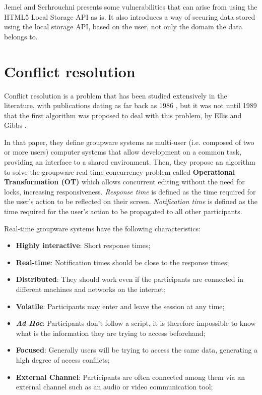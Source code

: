 Jemel and Serhrouchni \cite{Jemel2014} presents some vulnerabilities that can arise from using the HTML5 Local Storage API as is. It also introduces a way of securing data stored using the local storage API, based on the user, not only the domain the data belongs to.


\section{Conflict resolution}\label{sec:conflict-res-sota}

Conflict resolution is a problem that has been studied extensively in the literature, with publications dating as far back as 1986 \cite{Greif1986}, but it was not until 1989 that the first algorithm was proposed to deal with this problem, by Ellis and Gibbs \cite{Ellis1989}.

In that paper, they define groupware systems as multi-user (i.e. composed of two or more users) computer systems that allow development on a common task, providing an interface to a shared environment. Then, they propose an algorithm to solve the groupware real-time concurrency problem called \textbf{Operational Transformation (OT)} which allows concurrent editing without the need for locks, increasing responsiveness. \textit{Response time} is defined as the time required for the user's action to be reflected on their screen. \textit{Notification time} is defined as the time required for the user's action to be propagated to all other participants.

Real-time groupware systems have the following characteristics:

\begin{itemize}
    \item \textbf{Highly interactive}: Short response times;
    \item \textbf{Real-time}: Notification times should be close to the response times;
    \item \textbf{Distributed}: They should work even if the participants are connected in different machines and networks on the internet;
    \item \textbf{Volatile}: Participants may enter and leave the session at any time;
    \item \textbf{\textit{Ad Hoc}}: Participants don't follow a script, it is therefore impossible to know what is the information they are trying to access beforehand;
    \item \textbf{Focused}: Generally users will be trying to access the same data, generating a high degree of access conflicts;
    \item \textbf{External Channel}: Participants are often connected among them via an external channel such as an audio or video communication tool;
\end{itemize}

